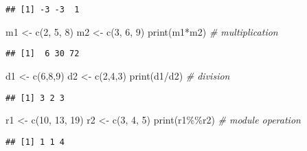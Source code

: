 \documentclass[
]{article}
\newenvironment{Shaded}{\begin{snugshade}}{\end{snugshade}}
\newcommand{\CommentTok}[1]{\textcolor[rgb]{0.56,0.35,0.01}{\textit{#1}}}
\newcommand{\DecValTok}[1]{\textcolor[rgb]{0.00,0.00,0.81}{#1}}
\newcommand{\FunctionTok}[1]{\textcolor[rgb]{0.00,0.00,0.00}{#1}}
\newcommand{\NormalTok}[1]{#1}
\newcommand{\OtherTok}[1]{\textcolor[rgb]{0.56,0.35,0.01}{#1}}
\newcommand{\SpecialCharTok}[1]{\textcolor[rgb]{0.00,0.00,0.00}{#1}}
\begin{document}
\begin{verbatim}
## [1] -3 -3  1
\end{verbatim}

\begin{Shaded}
\begin{Highlighting}[]
\NormalTok{m1 }\OtherTok{\textless{}{-}} \FunctionTok{c}\NormalTok{(}\DecValTok{2}\NormalTok{, }\DecValTok{5}\NormalTok{, }\DecValTok{8}\NormalTok{)}
\NormalTok{m2 }\OtherTok{\textless{}{-}} \FunctionTok{c}\NormalTok{(}\DecValTok{3}\NormalTok{, }\DecValTok{6}\NormalTok{, }\DecValTok{9}\NormalTok{)}
\FunctionTok{print}\NormalTok{(m1}\SpecialCharTok{*}\NormalTok{m2) }\CommentTok{\# multiplication}
\end{Highlighting}
\end{Shaded}

\begin{verbatim}
## [1]  6 30 72
\end{verbatim}

\begin{Shaded}
\begin{Highlighting}[]
\NormalTok{d1 }\OtherTok{\textless{}{-}} \FunctionTok{c}\NormalTok{(}\DecValTok{6}\NormalTok{,}\DecValTok{8}\NormalTok{,}\DecValTok{9}\NormalTok{)}
\NormalTok{d2 }\OtherTok{\textless{}{-}} \FunctionTok{c}\NormalTok{(}\DecValTok{2}\NormalTok{,}\DecValTok{4}\NormalTok{,}\DecValTok{3}\NormalTok{)}
\FunctionTok{print}\NormalTok{(d1}\SpecialCharTok{/}\NormalTok{d2) }\CommentTok{\# division}
\end{Highlighting}
\end{Shaded}

\begin{verbatim}
## [1] 3 2 3
\end{verbatim}

\begin{Shaded}
\begin{Highlighting}[]
\NormalTok{r1 }\OtherTok{\textless{}{-}} \FunctionTok{c}\NormalTok{(}\DecValTok{10}\NormalTok{, }\DecValTok{13}\NormalTok{, }\DecValTok{19}\NormalTok{)}
\NormalTok{r2 }\OtherTok{\textless{}{-}} \FunctionTok{c}\NormalTok{(}\DecValTok{3}\NormalTok{, }\DecValTok{4}\NormalTok{, }\DecValTok{5}\NormalTok{)}
\FunctionTok{print}\NormalTok{(r1}\SpecialCharTok{\%\%}\NormalTok{r2) }\CommentTok{\# module operation}
\end{Highlighting}
\end{Shaded}

\begin{verbatim}
## [1] 1 1 4
\end{verbatim}
\end{document}
